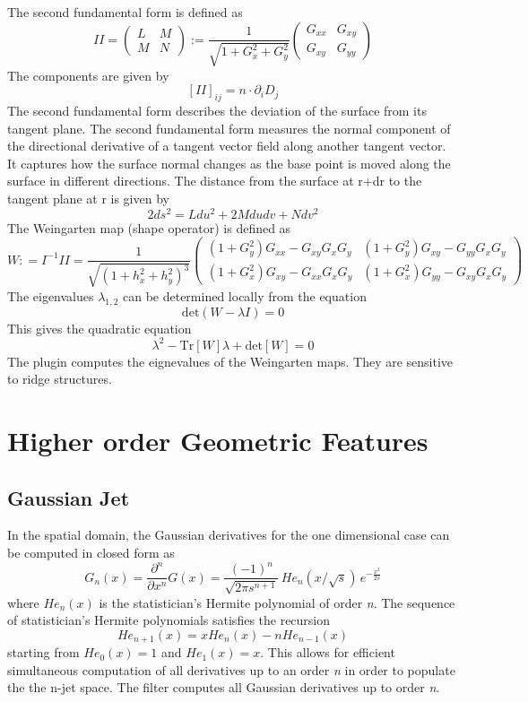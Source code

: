 \documentclass{amsart}
\begin{document}
The second fundamental form is defined as
\[
II = \begin{pmatrix}
	L & M \\
	M & N
\end{pmatrix} :=
\frac{1}{\sqrt{1 +G_x^2 + G_y^2}}
\begin{pmatrix}
	 G_{xx}  &  G_{xy} \\
	 G_{xy}  &  G_{yy} 
\end{pmatrix}
\]
The components are given by
\[
[II]_{ij} = n \cdot  \partial_{i} D_j  %
\]
The second fundamental form describes the deviation of the surface
from its tangent plane.
The second fundamental form measures the normal component of the directional derivative of a tangent vector field along another tangent vector.
It captures how the surface normal changes as the base point is moved along the surface in different directions.
The distance from the surface at r+dr to the tangent plane at r is given by
\[
2 ds^2 = L du^2 + 2 M du dv + N dv^2
\]
The Weingarten map (shape operator) is defined as
\[
W: = I^{-1} II = \frac{1}{\sqrt{\left( 1 +h_x^2 + h_y^2 \right)^3 }} 
\begin{pmatrix}
	(1+ G_{y}^2) G_{xx} - G_{xy} G_x G_y &  (1+ G_{y}^2) G_{xy} - G_{yy} G_x G_y  \\
	(1+ G_{x}^2) G_{xy} - G_{xx} G_x G_y  & (1+ G_{x}^2) G_{yy} - G_{xy} G_x G_y
\end{pmatrix}
\]
The eigenvalues $\lambda_{1,2}$ can be determined locally from the equation 
\[
\mathrm{det} ( {W} - \lambda  {I} )= 0
\]
This gives the quadratic equation
\[
\lambda^2 - \mathrm{Tr} [W]  \lambda + 	\mathrm{det}  [W] =  0
\]
The plugin computes the eignevalues of the Weingarten maps.
They are sensitive to ridge structures.

\section{Higher order Geometric Features}\label{sec:nroder}

\subsection{Gaussian Jet}\label{sec:gjet}
In the spatial domain, the  Gaussian derivatives for the one dimensional case can be  computed in closed form as
\[
G_n \left(x \right) = \frac{\partial^n}{\partial x^n} G \left(x \right) = \frac{(-1)^n} {\sqrt{ 2 \pi s^{n+1}}}  \,{He}_{n}\left(  {x}/{\sqrt{s}}\right) \,
e^{-\frac{x^2}{2s}}  
\]
where $He_n (x)$ is the statistician's Hermite polynomial of order \textit{n}.
The sequence of statistician's Hermite polynomials satisfies the recursion
\[
He_{n+1} (x) =x He_{n} (x) - n He_{n-1} (x)    
\]
starting from  $He_0 (x) = 1$ and $He_1 (x) = x$. 
This allows for efficient simultaneous computation of all derivatives up to an order \textit{n} in order to populate the the n-jet space.
The filter computes all Gaussian derivatives up to order \textit{n}.
\end{document}
